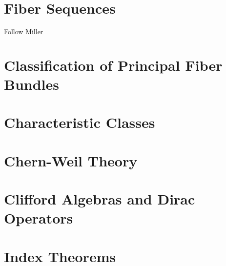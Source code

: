 
\section{Fiber Sequences}
Follow Miller

\section{Classification of Principal Fiber Bundles}

\section{Characteristic Classes}

\section{Chern-Weil Theory}
\section{Clifford Algebras and Dirac Operators}
\section{Index Theorems}
